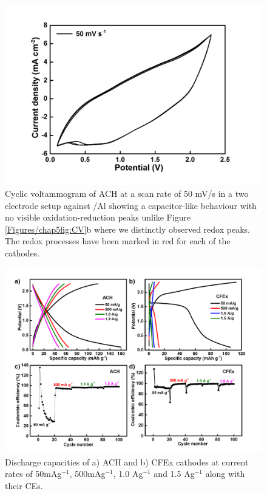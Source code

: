\begin{figure}[h!]
\centering
\includegraphics[width=\textwidth]{Figures/chap5fig/hair50mVs}
\caption{Cyclic voltammogram of ACH at a scan rate of 50 mV/s in a two electrode setup against /Al showing a capacitor-like behaviour with no visible oxidation-reduction peaks unlike Figure \ref{Figures/chap5fig:CV}b where we distinctly observed redox peaks. The redox processes have been marked in red for each of the cathodes.}
\label{Figures/chap5fig:hair50mVs}
\end{figure}

\begin{figure}[h!]
  \centering
  \includegraphics[width=\textwidth]{Figures/chap5fig/cfexachlong}
    \caption{Discharge capacities of a) ACH and b) CFEx cathodes at current rates of 50mAg$^{-1}$, 500mAg$^{-1}$, 1.0 Ag$^{-1}$ and 1.5 Ag$^{-1}$ along with their CEs. }
  \label{Figures/chap5fig:cfexachlong}
\end{figure}

